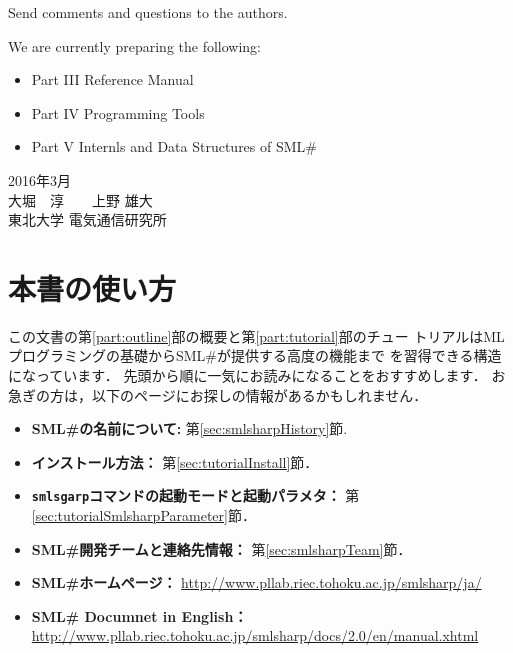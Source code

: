 \documentclass{jbook}
\newif\ifjp
\newcommand{\txt}[2]{#1}
\newcommand{\authors}
{\txt{大堀\ \ 淳\mbox{\ \ \ \ }上野 雄大
\\
東北大学 電気通信研究所
}
{Atsushi Ohori\mbox{\ \ \ \ }Katsuhiro Ueno
\\
RIEC, Tohoku University
}
}
\newcommand{\smlsharp}{SML\#}
\newcommand{\documentUrlEn}{\url{http://www.pllab.riec.tohoku.ac.jp/smlsharp/docs/2.0/en/manual.xhtml}}
\begin{document}
	Send comments and questions to the authors.

\bigskip
\bigskip

We are currently preparing the following:
\begin{itemize}
\item Part III Reference Manual
\item Part IV Programming Tools
\item Part V  Internls and Data Structures of \smlsharp{}
\end{itemize}
\fi%

\begin{flushright}
\txt{
2016年3月\\
\authors
}
{
March, 2016\\
\authors
}
\end{flushright}

\chapter{\txt{本書の使い方}{How to read this document}}

\ifjp%
    この文書の第\ref{part:outline}部の概要と第\ref{part:tutorial}部のチュー
トリアルはMLプログラミングの基礎から\smlsharp{}が提供する高度の機能まで
を習得できる構造になっています．
	先頭から順に一気にお読みになることをおすすめします．
	お急ぎの方は，以下のページにお探しの情報があるかもしれません．
\begin{itemize}
\item {\bf \smlsharp{}の名前について:}
第\ref{sec:smlsharpHistory}節.
\item {\bf インストール方法：}
第\ref{sec:tutorialInstall}節．
\item {\bf {\tt smlsgarp}コマンドの起動モードと起動パラメタ：}
第\ref{sec:tutorialSmlsharpParameter}節．
\item {\bf \smlsharp{}開発チームと連絡先情報：} 第\ref{sec:smlsharpTeam}節．
\item {\bf \smlsharp{}ホームページ：}
\url{http://www.pllab.riec.tohoku.ac.jp/smlsharp/ja/}
\item {\bf \smlsharp{} Documnet in English：}
\documentUrlEn
\end{itemize}   
\end{document}
